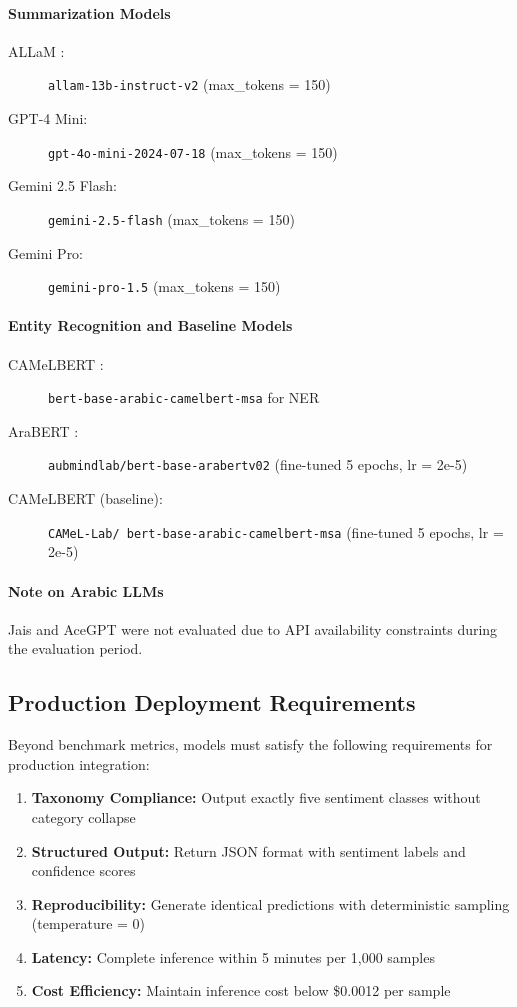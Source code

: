 \documentclass[10pt,a4paper]{article}
\begin{document}
\paragraph{Summarization Models}
\begin{description}
    \item[ALLaM \citep{Abdelali2024}:] \texttt{allam-13b-instruct-v2} (max\_tokens = 150)
    \item[GPT-4 Mini:] \texttt{gpt-4o-mini-2024-07-18} (max\_tokens = 150)
    \item[Gemini 2.5 Flash:] \texttt{gemini-2.5-flash} (max\_tokens = 150)
    \item[Gemini Pro:] \texttt{gemini-pro-1.5} (max\_tokens = 150)
\end{description}

\paragraph{Entity Recognition and Baseline Models}
\begin{description}
    \item[CAMeLBERT \citep{Inoue2021}:] \texttt{bert-base-arabic-camelbert-msa} for NER
    \item[AraBERT \citep{Antoun2020}:] \texttt{aubmindlab/bert-base-arabertv02} (fine-tuned 5 epochs, lr = 2e-5)
    \item[CAMeLBERT (baseline):]      \texttt{CAMeL-Lab/
    bert-base-arabic-camelbert-msa} (fine-tuned 5 epochs, lr = 2e-5)
\end{description}
\paragraph{Note on Arabic LLMs}
Jais \citep{Sengupta2023} and AceGPT \citep{Huang2024} were not evaluated due to API availability constraints during the evaluation period.

\subsection{Production Deployment Requirements}

Beyond benchmark metrics, models must satisfy the following requirements for production integration:

\begin{enumerate}
    \item \textbf{Taxonomy Compliance:} Output exactly five sentiment classes without category collapse
    \item \textbf{Structured Output:} Return JSON format with sentiment labels and confidence scores
    \item \textbf{Reproducibility:} Generate identical predictions with deterministic sampling (temperature = 0)
    \item \textbf{Latency:} Complete inference within 5 minutes per 1,000 samples
    \item \textbf{Cost Efficiency:} Maintain inference cost below \$0.0012 per sample
\end{enumerate}
\end{document}
